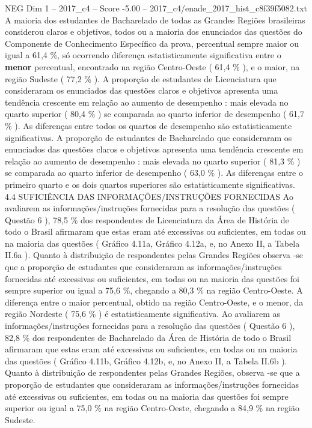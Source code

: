 \begin{textsample}{NEG Dim 1 – 2017\_c4 – Score -5.00 – 2017\_c4/enade\_2017\_hist\_c8f39f5082.txt}
A maioria dos estudantes de Bacharelado de todas as Grandes Regiões brasileiras considerou claros e objetivos, todos ou a maioria dos enunciados das questões do Componente de Conhecimento Específico da prova, percentual sempre maior ou igual a 61,4 \%, só ocorrendo diferença estatisticamente significativa entre o \textbf{menor} percentual, encontrado na região Centro-Oeste ( 61,4 \% ), e o maior, na região Sudeste ( 77,2 \% ).
A proporção de estudantes de Licenciatura que consideraram os enunciados das questões claros e objetivos apresenta uma tendência crescente em relação ao aumento de desempenho : mais elevada no quarto superior ( 80,4 \% ) se comparada ao quarto inferior de desempenho ( 61,7 \% ).
As diferenças entre todos os quartos de desempenho são estatisticamente significativas.
A proporção de estudantes de Bacharelado que consideraram os enunciados das questões claros e objetivos apresenta uma tendência crescente em relação ao aumento de desempenho : mais elevada no quarto superior ( 81,3 \% ) se comparada ao quarto inferior de desempenho ( 63,0 \% ).
As diferenças entre o primeiro quarto e os dois quartos superiores são estatisticamente significativas. 4.4 SUFICIÊNCIA DAS INFORMAÇÕES/INSTRUÇÕES FORNECIDAS Ao avaliarem as informações/instruções fornecidas para a resolução das questões ( Questão 6 ), 78,5 \% dos respondentes de Licenciatura da Área de História de todo o Brasil afirmaram que estas eram até excessivas ou suficientes, em todas ou na maioria das questões ( Gráfico 4.11a, Gráfico 4.12a, e, no Anexo II, a Tabela II.6a ).
Quanto à distribuição de respondentes pelas Grandes Regiões observa -se que a proporção de estudantes que consideraram as informações/instruções fornecidas até excessivas ou suficientes, em todas ou na maioria das questões foi sempre superior ou igual a 75,6 \%, chegando a 80,3 \% na região Centro-Oeste.
A diferença entre o maior percentual, obtido na região Centro-Oeste, e o menor, da região Nordeste ( 75,6 \% ) é estatisticamente significativa.
Ao avaliarem as informações/instruções fornecidas para a resolução das questões ( Questão 6 ), 82,8 \% dos respondentes de Bacharelado da Área de História de todo o Brasil afirmaram que estas eram até excessivas ou suficientes, em todas ou na maioria das questões ( Gráfico 4.11b, Gráfico 4.12b, e, no Anexo II, a Tabela II.6b ).
Quanto à distribuição de respondentes pelas Grandes Regiões, observa -se que a proporção de estudantes que consideraram as informações/instruções fornecidas até excessivas ou suficientes, em todas ou na maioria das questões foi sempre superior ou igual a 75,0 \% na região Centro-Oeste, chegando a 84,9 \% na região Sudeste.

\end{textsample}
